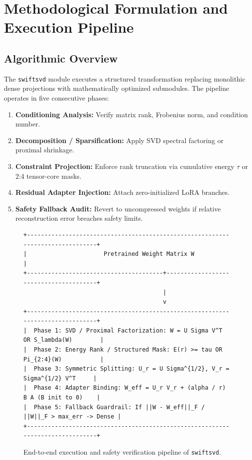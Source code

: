 \section{Methodological Formulation and Execution Pipeline}

\subsection{Algorithmic Overview}
The \texttt{swiftsvd} module executes a structured transformation replacing monolithic dense projections with mathematically optimized submodules. The pipeline operates in five consecutive phases:
\begin{enumerate}
\item \textbf{Conditioning Analysis:} Verify matrix rank, Frobenius norm, and condition number.
\item \textbf{Decomposition / Sparsification:} Apply SVD spectral factoring or proximal shrinkage.
\item \textbf{Constraint Projection:} Enforce rank truncation via cumulative energy $\tau$ or 2:4 tensor-core masks.
\item \textbf{Residual Adapter Injection:} Attach zero-initialized LoRA branches.
\item \textbf{Safety Fallback Audit:} Revert to uncompressed weights if relative reconstruction error breaches safety limits.
\end{enumerate}

\begin{figure}[t]
\centering
\begin{verbatim}
+-------------------------------------------------------------------------------+
|                      Pretrained Weight Matrix W                               |
+---------------------------------------+---------------------------------------+
                                        |
                                        v
+-------------------------------------------------------------------------------+
|  Phase 1: SVD / Proximal Factorization: W = U Sigma V^T OR S_lambda(W)        |
|  Phase 2: Energy Rank / Structured Mask: E(r) >= tau OR Pi_{2:4}(W)           |
|  Phase 3: Symmetric Splitting: U_r = U Sigma^{1/2}, V_r = Sigma^{1/2} V^T     |
|  Phase 4: Adapter Binding: W_eff = U_r V_r + (alpha / r) B A (B init to 0)    |
|  Phase 5: Fallback Guardrail: If ||W - W_eff||_F / ||W||_F > max_err -> Dense |
+-------------------------------------------------------------------------------+
\end{verbatim}
\caption{End-to-end execution and safety verification pipeline of \texttt{swiftsvd}.}
\end{figure}

